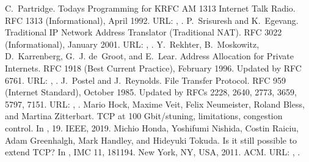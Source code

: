 \documentclass[letterpaper,10pt,english]{sphinxmanual}
\begin{document}
\begin{sphinxthebibliography}{10}
\sphinxAtStartPar
C. Partridge. Today\textquotesingle{}s Programming for KRFC AM 1313 Internet Talk Radio. RFC 1313 (Informational), April 1992. URL: , .
\sphinxAtStartPar
P. Srisuresh and K. Egevang. Traditional IP Network Address Translator (Traditional NAT). RFC 3022 (Informational), January 2001. URL: , .
\sphinxAtStartPar
Y. Rekhter, B. Moskowitz, D. Karrenberg, G. J. de Groot, and E. Lear. Address Allocation for Private Internets. RFC 1918 (Best Current Practice), February 1996. Updated by RFC 6761. URL: , .
\sphinxAtStartPar
J. Postel and J. Reynolds. File Transfer Protocol. RFC 959 (Internet Standard), October 1985. Updated by RFCs 2228, 2640, 2773, 3659, 5797, 7151. URL: , .
\sphinxAtStartPar
Mario Hock, Maxime Veit, Felix Neumeister, Roland Bless, and Martina Zitterbart. TCP at 100 Gbit/s\textendash{}tuning, limitations, congestion control. In , 1\textendash{}9. IEEE, 2019.
\sphinxAtStartPar
Michio Honda, Yoshifumi Nishida, Costin Raiciu, Adam Greenhalgh, Mark Handley, and Hideyuki Tokuda. Is it still possible to extend TCP? In , IMC \textquotesingle{}11, 181\textendash{}194. New York, NY, USA, 2011. ACM. URL: , .
\end{sphinxthebibliography}



\renewcommand{\indexname}{Index}
\printindex
\end{document}
